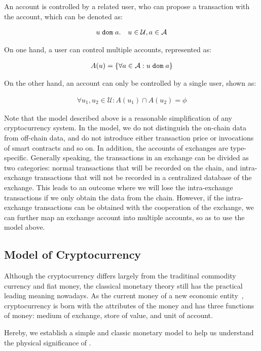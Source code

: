 An account is controlled by a related user, who can propose a transaction with the account, which can be denoted as:

\begin{align}
u {\; \texttt{dom}\;} a. \quad u\in \mathcal{U}, a\in \mathcal{A}
\end{align}

\noindent On one hand, a user can control multiple accounts, represented as:

\begin{align}
A(u) = \{\forall a\in \mathcal{A} : u {\; \texttt{dom}\;} a\}
\end{align}

\noindent On the other hand, an account can only be controlled by a single user, shown as:

\begin{align}
\forall u_1, u_2 \in \mathcal{U} : A(u_1) \cap A(u_2) = \phi
\end{align}

Note that the model described above is a reasonable simplification of any cryptocurrency system. In the model, we do not distinguish the on-chain data from off-chain data, and do not introduce either transaction price or invocations of smart contracts and so on. In addition, the accounts of exchanges are type-specific. Generally speaking, the transactions in an exchange can be divided as two categories: normal transactions that will be recorded on the chain, and intra-exchange transactions that will not be recorded in a centralized database of the exchange. This leads to an outcome where we will lose the intra-exchange transactions if we only obtain the data from the chain. 
However, if the intra-exchange transactions can be obtained with the cooperation of the exchange, we can further map an exchange account into multiple accounts, so as to use the model above.


\subsection{Model of Cryptocurrency}
Although the cryptocurrency differs largely from the traditinal commodity currency and fiat money, the classical monetary theory still has the practical leading meaning nowadays. As the current money of a new economic entity~\cite{swan2015blockchain}, cryptocurrency is born with the attributes of the money and has three functions of money: medium of exchange, store of value, and unit of account. 

Hereby, we establish a simple and classic monetary model to help us understand the physical significance of \nr.

